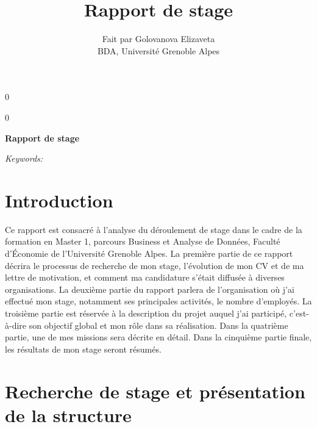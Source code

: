 \documentclass[12pt]{article}
\newcommand{\blind}{0}
\begin{document}
\def\spacingset#1{\renewcommand{\baselinestretch}%
{#1}\small\normalsize} \spacingset{1}



\blind
{
  \title{\bf Rapport de stage}

  \author{
        Fait par Golovanova Elizaveta \\
    BDA, Université Grenoble Alpes\\
      }
  \maketitle
} \fi

\blind
{
  \bigskip
  \bigskip
  \bigskip
  \begin{center}
    {\LARGE\bf Rapport de stage}
  \end{center}
  \medskip
} \fi

\bigskip
\begin{abstract}

\end{abstract}

\noindent%
{\it Keywords:} 
\vfill

\newpage
\spacingset{1.45} %

\newpage
\tableofcontents 
\newpage

\hypertarget{introduction}{%
\section{Introduction}\label{introduction}}

Ce rapport est consacré à l'analyse du déroulement de stage dans le
cadre de la formation en Master 1, parcours Business et Analyse de
Données, Faculté d'Économie de l'Université Grenoble Alpes. La première
partie de ce rapport décrira le processus de recherche de mon stage,
l'évolution de mon CV et de ma lettre de motivation, et comment ma
candidature s'était diffusée à diverses organisations. La deuxième
partie du rapport parlera de l'organisation où j'ai effectué mon stage,
notamment ses principales activités, le nombre d'employés. La troisième
partie est réservée à la description du projet auquel j'ai participé,
c'est-à-dire son objectif global et mon rôle dans sa réalisation. Dans
la quatrième partie, une de mes missions sera décrite en détail. Dans la
cinquième partie finale, les résultats de mon stage seront résumés.

\section{Recherche de stage et présentation de la structure}
\label{sec:first}
\end{document}

